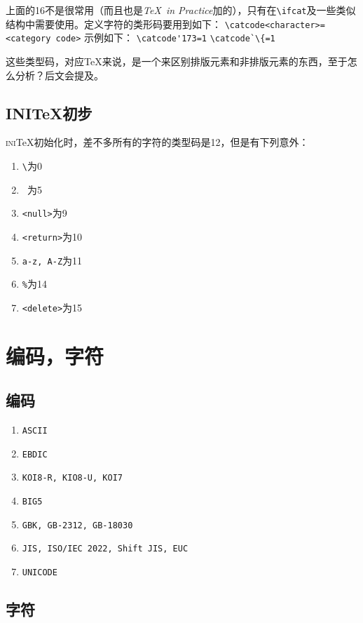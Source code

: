 \documentclass{article}
\newcommand{\TIP}{\textit{\TeX\ in Practice}}
\begin{document}
上面的16不是很常用（而且也是\TIP 加的），只有在\verb!\ifcat!及一些类似结构中需要使用。定义字符的类形码要用到如下：\newline
\verb!\catcode!\verb!<character>=<category code>!\newline
示例如下：\newline
\verb!\catcode!\verb!'173=1!\newline
\verb!\catcode!\verb!`\{=1!

这些类型码，对应\TeX 来说，是一个来区别排版元素和非排版元素的东西，至于怎么分析？后文会提及。
\subsection{\textsc{INI}\TeX 初步}
\textsc{ini}\TeX 初始化时，差不多所有的字符的类型码是12，但是有下列意外：
\begin{enumerate}
\item \verb!\!为0
\item \verb*! !为5
\item \verb!<null>!为9
\item \verb!<return>!为10
\item \verb!a-z, A-Z!为11
\item \verb!%!为14
\item \verb!<delete>!为15
\end{enumerate}
\section{编码，字符}
\subsection{编码}
\begin{enumerate}
\item \verb!ASCII!
\item \verb!EBDIC!
\item \verb!KOI8-R, KIO8-U, KOI7!
\item \verb!BIG5!
\item \verb!GBK, GB-2312, GB-18030!
\item \verb!JIS, ISO/IEC 2022, Shift JIS, EUC!
\item \verb!UNICODE!
\end{enumerate}
\subsection{字符}
\end{document}
